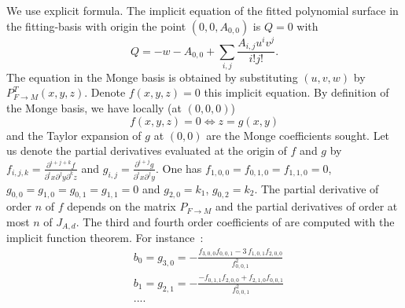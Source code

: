 \begin{ccAdvanced}
We use explicit formula. The implicit equation of the fitted
polynomial surface in the fitting-basis with origin the point
$(0,0,A_{0,0})$ is $Q=0$ with
\begin{equation}
Q=-w-A_{0,0}  +\sum_{i,j}\frac{A_{i,j}u^iv^j}{i!j!}.
\end{equation}
The equation in the Monge basis is obtained by substituting $(u,v,w)$
by $P^T_{F\rightarrow M}(x,y,z)$. Denote $f(x,y,z)=0$ this implicit
equation. By definition of the Monge basis, we have locally (at
$(0,0,0)$)
\begin{equation}
f(x,y,z)=0 \Leftrightarrow z=g(x,y)
\end{equation}
and the Taylor expansion of $g$ at $(0,0)$ are the Monge coefficients
sought.
%
Let us denote the partial derivatives evaluated at the origin of $f$
and $g$ by $f_{i,j,k}=\frac{\partial^{i+j+k}f}{\partial^ix
\partial^jy \partial^kz}$ and $g_{i,j}=\frac{\partial^{i+j}g}{\partial^ix
\partial^jy}$. One has $f_{1,0,0}=f_{0,1,0}=f_{1,1,0}=0$,
$g_{0,0}=g_{1,0}=g_{0,1}=g_{1,1}=0$ and $g_{2,0}=k_1$,
$g_{0,2}=k_2$. The partial derivative of order $n$ of $f$ depends on
the matrix $P_{F\rightarrow M}$ and the partial derivatives of order
at most $n$ of $J_{A,d}$. The third and fourth order coefficients of are
computed with the implicit function theorem. For instance~:
\begin{eqnarray*}
&b_0=g_{3,0}=-{\frac { f_{3,0,0} f_{0,0,1} -3\, f_{1,0,1} f_{2,0,0} }{
f_{0,0,1} ^{2}}}
\\
&b_1=g_{2,1}=-{\frac {-  f_{0,1,1}      f_{2,0,0}    +  f_{2,1,0}    f_{0,0,1}  }{  f_{0,0,1}    ^{2}}}
\\
& .... \\
\end{eqnarray*} 
 \end{ccAdvanced} 